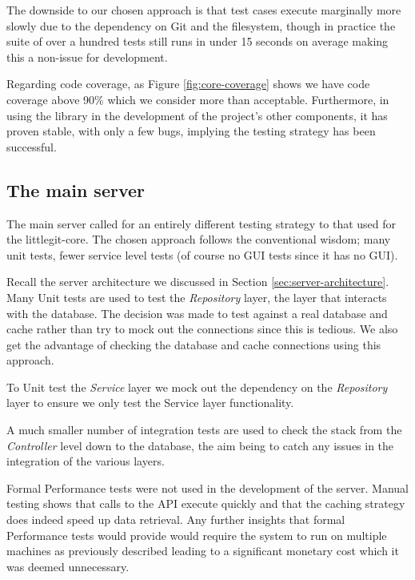 The downside to our chosen approach is that test cases execute marginally more slowly due to the dependency on Git and the filesystem, though in practice the suite of over a hundred tests still runs in under 15 seconds on average making this a non-issue for development.

Regarding code coverage, as Figure \ref{fig:core-coverage} shows we have code coverage above 90\% which we consider more than acceptable. Furthermore, in using the library in the development of the project's other components, it has proven stable, with only a few bugs, implying the testing strategy has been successful.


\subsection{The main server}

The main server called for an entirely different testing strategy to that used for the littlegit-core. The chosen approach follows the conventional wisdom; many unit tests, fewer service level tests (of course no GUI tests since it has no GUI).

Recall the server architecture we discussed in Section \ref{sec:server-architecture}. Many Unit tests are used to test the \emph{Repository} layer, the layer that interacts with the database. The decision was made to test against a real database and cache rather than try to mock out the connections since this is tedious. We also get the advantage of checking the database and cache connections using this approach.

To Unit test the \emph{Service} layer we mock out the dependency on the \emph{Repository} layer to ensure we only test the Service layer functionality. 

A much smaller number of integration tests are used to check the stack from the \emph{Controller} level down to the database, the aim being to catch any issues in the integration of the various layers. 

Formal Performance tests were not used in the development of the server. Manual testing shows that calls to the API execute quickly and that the caching strategy does indeed speed up data retrieval. Any further insights that formal Performance tests would provide would require the system to run on multiple machines as previously described leading to a significant monetary cost which it was deemed unnecessary.

